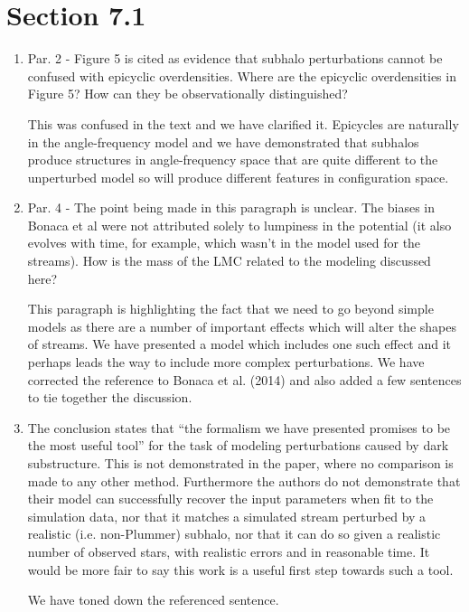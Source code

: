\documentclass{article}
\begin{document}
\section{Section 7.1}
\begin{enumerate}
\item Par. 2 - Figure 5 is cited as evidence that subhalo perturbations cannot be confused
with epicyclic overdensities. Where are the epicyclic overdensities in Figure 5? How can
they be observationally distinguished?

{\color{red} This was confused in the text and we have clarified it. Epicycles are naturally in the angle-frequency model and we have demonstrated that subhalos produce structures in angle-frequency space that are quite different to the unperturbed model so will produce different features in configuration space.}

\item Par. 4 - The point being made in this paragraph is unclear. The biases in Bonaca et al
were not attributed solely to lumpiness in the potential (it also evolves with time, for
example, which wasn’t in the model used for the streams). How is the mass of the LMC
related to the modeling discussed here?

{\color{red} This paragraph is highlighting the fact that we need to go beyond simple models as there are a number of important effects which will alter the shapes of streams. We have presented a model which includes one such effect and it perhaps leads the way to include more complex perturbations. We have corrected the reference to Bonaca et al. (2014) and also added a few sentences to tie together the discussion.}

\item The conclusion states that “the formalism we have presented promises to be the most
useful tool” for the task of modeling perturbations caused by dark substructure. This is
not demonstrated in the paper, where no comparison is made to any other method.
Furthermore the authors do not demonstrate that their model can successfully recover
the input parameters when fit to the simulation data, nor that it matches a simulated
stream perturbed by a realistic (i.e. non-Plummer) subhalo, nor that it can do so given a
realistic number of observed stars, with realistic errors and in reasonable time. It would
be more fair to say this work is a useful first step towards such a tool.

{\color{red} We have toned down the referenced sentence.}
\end{enumerate}
\end{document}
